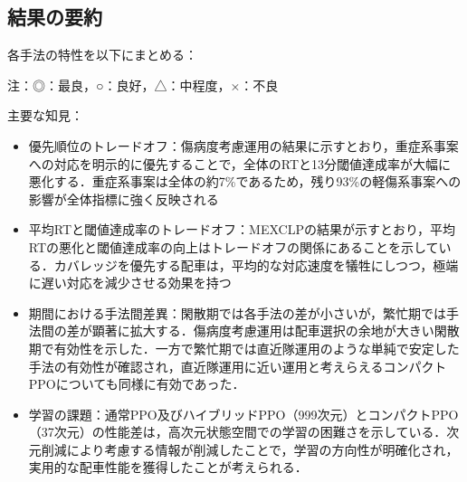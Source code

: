 \subsection{結果の要約}
各手法の特性を以下にまとめる：

\begin{table}[htbp]
    \centering
    \caption{各配車手法の性能評価および総評}
    \label{tab:method_evaluation_summary}
    \footnotesize
    \begin{flushleft}
    注：◎：最良，○：良好，△：中程度，×：不良
    \end{flushleft}
\end{table}

主要な知見：
\begin{itemize}
  \item 優先順位のトレードオフ：傷病度考慮運用の結果に示すとおり，重症系事案への対応を明示的に優先することで，全体のRTと13分閾値達成率が大幅に悪化する．重症系事案は全体の約7\%であるため，残り93\%の軽傷系事案への影響が全体指標に強く反映される
  \item 平均RTと閾値達成率のトレードオフ：MEXCLPの結果が示すとおり，平均RTの悪化と閾値達成率の向上はトレードオフの関係にあることを示している．カバレッジを優先する配車は，平均的な対応速度を犠牲にしつつ，極端に遅い対応を減少させる効果を持つ
  \item 期間における手法間差異：閑散期では各手法の差が小さいが，繁忙期では手法間の差が顕著に拡大する．傷病度考慮運用は配車選択の余地が大きい閑散期で有効性を示した．一方で繁忙期では直近隊運用のような単純で安定した手法の有効性が確認され，直近隊運用に近い運用と考えらえるコンパクトPPOについても同様に有効であった．
  \item 学習の課題：通常PPO及びハイブリッドPPO（999次元）とコンパクトPPO（37次元）の性能差は，高次元状態空間での学習の困難さを示している．次元削減により考慮する情報が削減したことで，学習の方向性が明確化され，実用的な配車性能を獲得したことが考えられる．
\end{itemize}
\clearpage

